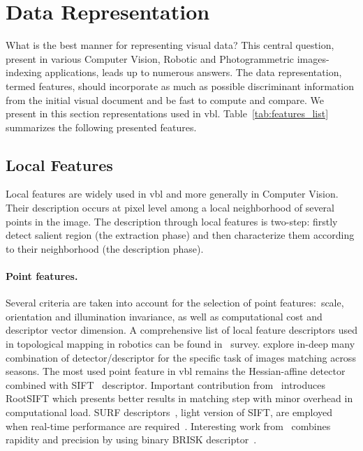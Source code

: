 \section{Data Representation}
\label{sec:image_representation}
	


	What is the best manner for representing visual data? This central question, present in various Computer Vision, Robotic and Photogrammetric images-indexing applications, leads up to numerous answers. The data representation, termed features, should incorporate as much as possible discriminant information from the initial visual document and be fast to compute and compare. We present in this section representations used in \ac{vbl}. Table~\ref{tab:features_list} summarizes the following presented features.
		
	\subsection{Local Features}
	\label{subsec:local_feature}
		Local features are widely used in \ac{vbl} and more generally in Computer Vision. Their description occurs at pixel level among a local neighborhood of several points in the image. The description through local features is two-step: firstly detect salient region (the extraction phase) and then characterize them according to their neighborhood (the description phase).
				
		\paragraph{Point features.} Several criteria are taken into account for the selection of point features:~scale, orientation and illumination invariance, as well as computational cost and descriptor vector dimension. A comprehensive list of local feature descriptors used in topological mapping in robotics can be found in~\citet{Garcia-Fidalgo2015} survey. \citet{Krajnik2017a} explore in-deep many combination of detector/descriptor for the specific task of images matching across seasons. The most used point feature in \ac{vbl} remains the Hessian-affine detector~\citep{Mikolajczyk2004} combined with SIFT~\citep{Lowe2004} descriptor. Important contribution from~\citet{Arandjelovic2012} introduces RootSIFT which presents better results in matching step with minor overhead in computational load. SURF descriptors~\citep{Bay2006}, light version of SIFT, are employed when real-time performance are required~\citep{Cummins2008,Qu2016,Stumm2016}. Interesting work from~\citet{Feng2016a} combines rapidity and precision by using binary BRISK descriptor~\citep{Leutenegger2011brisk}.
        
